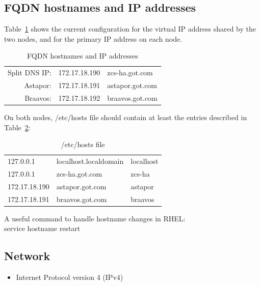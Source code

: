 \documentclass[a4paper, 12pt]{book}
\begin{document}
\subsection{FQDN hostnames and IP addresses}
\label{sec:fqdn}

Table~\ref{table:fqdn} shows the current configuration for the virtual IP address shared by the two nodes, and for the primary IP address on each node.

\FloatBarrier
\begin{table}[H]
  \centering
  \begin{tabular}{ | r c l | }
    \hline    
    Split DNS IP: & 172.17.18.190 & zcs-ha.got.com \\
	Astapor:      & 172.17.18.191 & astapor.got.com \\
	Braavos:      & 172.17.18.192 & braavos.got.com \\
    \hline
  \end{tabular}
\caption{FQDN hostnames and IP addresses}
\label{table:fqdn}
\end{table}

\noindent On both nodes, /etc/hosts file should contain at least the entries described in Table~\ref{table:hosts}:

\FloatBarrier
\begin{table}[H]
  \centering
  \begin{tabular}{ | l l l | }
    \hline    
    127.0.0.1     & localhost.localdomain & localhost \\
    127.0.0.1     & zcs-ha.got.com        & zcs-ha\\
	172.17.18.190 & astapor.got.com       & astapor\\
	172.17.18.191 & braavos.got.com       & braavos\\
    \hline
  \end{tabular}
\caption{/etc/hosts file}
\label{table:hosts}
\end{table}

\noindent A useful command to handle hostname changes in RHEL:\\
\indent service hostname restart\bigskip


\subsection{Network}
\label{sec:network}

\begin{itemize}
	\item Internet Protocol version 4 (IPv4)
\end{itemize}
\end{document}
